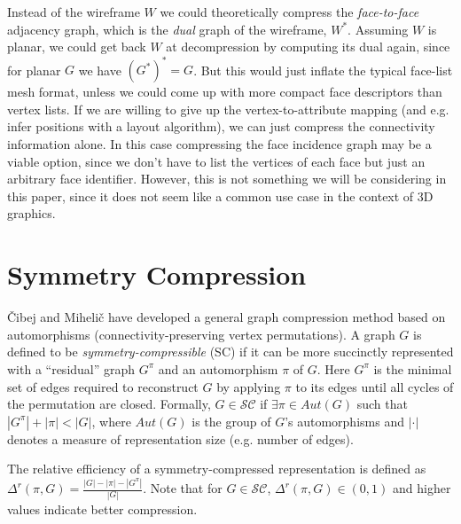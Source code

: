 \documentclass{egpubl}
\begin{document}
Instead of the wireframe $W$ we could theoretically compress the \textit{face-to-face} 
adjacency graph, which is the \textit{dual} graph of the wireframe, $W^*$. Assuming $W$ is planar, we could get back $W$ at decompression by computing its dual again, since for planar $G$ we have $(G^*)^* = G$.
But this would just inflate the typical face-list mesh format, unless we could come up with more compact face descriptors than vertex lists.
If we are willing to give up the vertex-to-attribute mapping (and e.g. infer positions with a layout algorithm), we can just compress the connectivity information alone. In this case compressing the face incidence graph may be a viable option, since we don't have to list the vertices of each face but just an arbitrary face identifier.
However, this is not something we will be considering in this paper, since it does not seem like a common use case in the context of 3D graphics.


\section{Symmetry Compression}

Čibej and Mihelič \cite{cibej2021automorphisms} have developed a general graph compression method based on automorphisms (connectivity-preserving vertex permutations).
A graph $G$ is defined to be \textit{symmetry-compressible} (SC)
if it can be more succinctly represented with a ``residual'' graph $G^\pi$ and an automorphism  $\pi$ of $G$. Here $G^\pi$ is the minimal set of edges required to reconstruct $G$ by applying $\pi$ to its edges until all cycles of the permutation are closed.
Formally, $G \in \mathcal{S}\mathcal{C}$ if $\exists \pi \in Aut(G)$ such that $|G^\pi| + |\pi| < |G|$, where $Aut(G)$ is the group of $G$'s automorphisms and $|\cdot|$ denotes a measure of representation size (e.g. number of edges). 

The relative efficiency of a symmetry-compressed representation is defined as
$\Delta^r(\pi, G) = \frac{|G| - |\pi| - |G^\pi|}{|G|}$.
Note that for $G \in \mathcal{S}\mathcal{C}$, $\Delta^r(\pi, G) \in (0, 1)$ and higher values indicate better compression.
\end{document}
